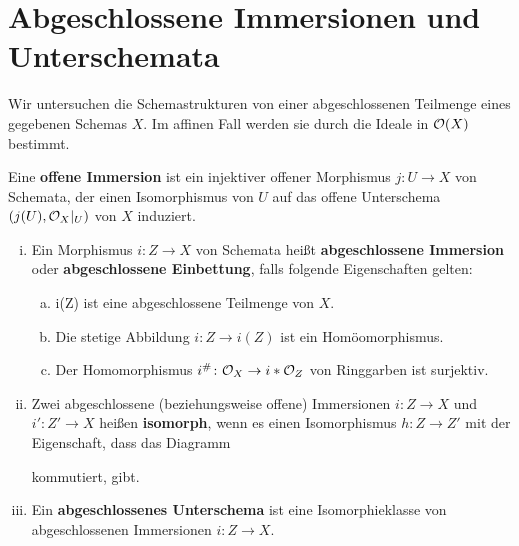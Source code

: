 
\chapter{Abgeschlossene Immersionen und Unterschemata}
Wir untersuchen die Schemastrukturen von einer abgeschlossenen Teilmenge eines gegebenen Schemas $X$. Im affinen Fall werden sie durch die Ideale in $\mathcal{O}(X)$ bestimmt.

\begin{defn}
\label{defn:7.1}
	Eine \textbf{offene Immersion} ist ein injektiver offener Morphismus $j\colon U \to X$ von Schemata, der einen Isomorphismus von $U$ auf das offene Unterschema $(j(U),\mathcal{O}_X\vert_U)$ von $X$ induziert.
\end{defn}

\begin{defn}
\label{defn:7.2}
	\begin{enumerate}[i)]
		\item Ein Morphismus $i \colon Z \to X$ von Schemata heißt \textbf{abgeschlossene Immersion} oder \textbf{abgeschlossene Einbettung}, falls folgende Eigenschaften gelten:
		\begin{enumerate}[a)]
			\item i(Z) ist eine abgeschlossene Teilmenge von $X$.
			\item Die stetige Abbildung $i\colon Z \to i(Z)$ ist ein Homöomorphismus.
			\item Der Homomorphismus $i^{\#}\colon \mathcal{O}_X \to i*\mathcal{O}_Z$ von Ringgarben ist surjektiv.
		\end{enumerate}
		\item Zwei abgeschlossene (beziehungsweise offene) Immersionen $i\colon Z \to X$ und $i'\colon Z' \to X$ heißen \textbf{isomorph}, wenn es einen Isomorphismus $h\colon Z \to Z'$ mit der Eigenschaft, dass das Diagramm
		\begin{center}
		\end{center}
		kommutiert, gibt.
		\item Ein \textbf{abgeschlossenes Unterschema} ist eine Isomorphieklasse von abgeschlossenen Immersionen $i \colon Z \to X$.
	\end{enumerate}	
\end{defn}

